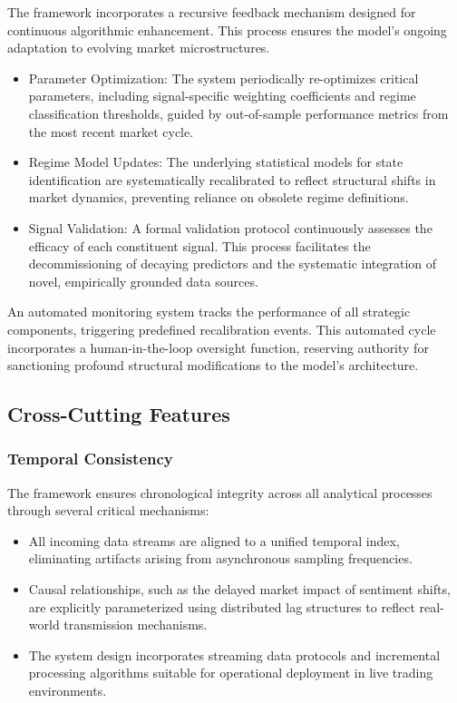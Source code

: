 \documentclass{singlecol-new}
\theoremstyle{TH}{
\newtheorem{lemma}{Lemma}
\newtheorem{theorem}[lemma]{Theorem}
\newtheorem{corrolary}[lemma]{Corrolary}
\newtheorem{conjecture}[lemma]{Conjecture}
\newtheorem{proposition}[lemma]{Proposition}
\newtheorem{claim}[lemma]{Claim}
\newtheorem{stheorem}[lemma]{Wrong Theorem}
\newtheorem{algorithm}{Algorithm}
}
\theoremstyle{THrm}{
\newtheorem{definition}{Definition}[section]
\newtheorem{question}{Question}[section]
\newtheorem{remark}{Remark}
\newtheorem{scheme}{Scheme}
}
\theoremstyle{THhit}{
\newtheorem{case}{Case}[section]
}
\begin{document}
The framework incorporates a recursive feedback mechanism designed for continuous algorithmic enhancement. This process ensures the model's ongoing adaptation to evolving market microstructures.
\begin{itemize}
    \item Parameter Optimization: The system periodically re-optimizes critical parameters, including signal-specific weighting coefficients and regime classification thresholds, guided by out-of-sample performance metrics from the most recent market cycle.
    \item Regime Model Updates: The underlying statistical models for state identification are systematically recalibrated to reflect structural shifts in market dynamics, preventing reliance on obsolete regime definitions.
    \item Signal Validation: A formal validation protocol continuously assesses the efficacy of each constituent signal. This process facilitates the decommissioning of decaying predictors and the systematic integration of novel, empirically grounded data sources.
\end{itemize}
An automated monitoring system tracks the performance of all strategic components, triggering predefined recalibration events. This automated cycle incorporates a human-in-the-loop oversight function, reserving authority for sanctioning profound structural modifications to the model's architecture.


\subsection{Cross-Cutting Features}
\subsubsection{Temporal Consistency}
The framework ensures chronological integrity across all analytical processes through several critical mechanisms:
\begin{itemize}
    \item All incoming data streams are aligned to a unified temporal index, eliminating artifacts arising from asynchronous sampling frequencies.
    \item Causal relationships, such as the delayed market impact of sentiment shifts, are explicitly parameterized using distributed lag structures to reflect real-world transmission mechanisms.
    \item The system design incorporates streaming data protocols and incremental processing algorithms suitable for operational deployment in live trading environments.
\end{itemize}
\end{document}
